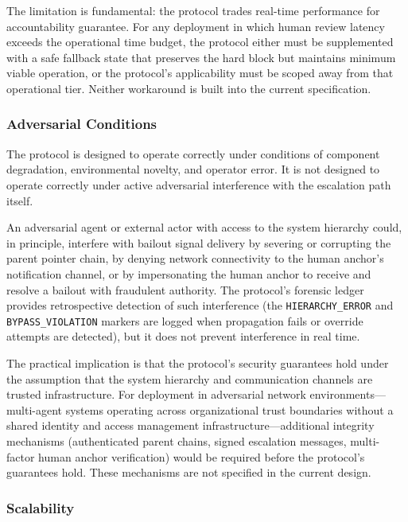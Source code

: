 The limitation is fundamental: the protocol trades real-time performance for accountability guarantee. For any deployment in which human review latency exceeds the operational time budget, the protocol either must be supplemented with a safe fallback state that preserves the hard block but maintains minimum viable operation, or the protocol's applicability must be scoped away from that operational tier. Neither workaround is built into the current specification.

\subsubsection{Adversarial Conditions}\label{sec:adversarial-conditions}

The protocol is designed to operate correctly under conditions of component degradation, environmental novelty, and operator error. It is not designed to operate correctly under active adversarial interference with the escalation path itself.

An adversarial agent or external actor with access to the system hierarchy could, in principle, interfere with bailout signal delivery by severing or corrupting the parent pointer chain, by denying network connectivity to the human anchor's notification channel, or by impersonating the human anchor to receive and resolve a bailout with fraudulent authority. The protocol's forensic ledger provides retrospective detection of such interference (the \texttt{HIERARCHY\_ERROR} and \texttt{BYPASS\_VIOLATION} markers are logged when propagation fails or override attempts are detected), but it does not prevent interference in real time.

The practical implication is that the protocol's security guarantees hold under the assumption that the system hierarchy and communication channels are trusted infrastructure. For deployment in adversarial network environments---multi-agent systems operating across organizational trust boundaries without a shared identity and access management infrastructure---additional integrity mechanisms (authenticated parent chains, signed escalation messages, multi-factor human anchor verification) would be required before the protocol's guarantees hold. These mechanisms are not specified in the current design.

\subsubsection{Scalability}\label{sec:scalability}

